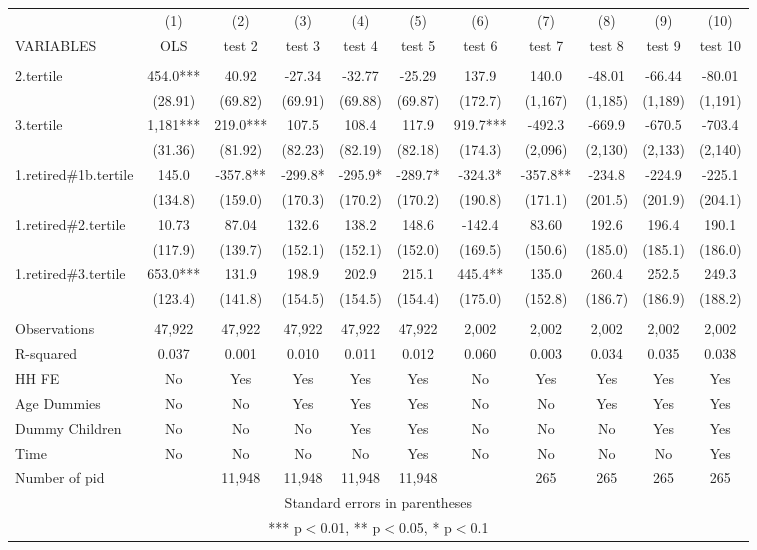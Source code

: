 \begin{tabular}{lcccccccccc} \hline
 & (1) & (2) & (3) & (4) & (5) & (6) & (7) & (8) & (9) & (10) \\
VARIABLES & OLS & test 2 & test 3 & test 4 & test 5 & test 6 & test 7 & test 8 & test 9 & test 10 \\ \hline
 &  &  &  &  &  &  &  &  &  &  \\
2.tertile & 454.0*** & 40.92 & -27.34 & -32.77 & -25.29 & 137.9 & 140.0 & -48.01 & -66.44 & -80.01 \\
 & (28.91) & (69.82) & (69.91) & (69.88) & (69.87) & (172.7) & (1,167) & (1,185) & (1,189) & (1,191) \\
3.tertile & 1,181*** & 219.0*** & 107.5 & 108.4 & 117.9 & 919.7*** & -492.3 & -669.9 & -670.5 & -703.4 \\
 & (31.36) & (81.92) & (82.23) & (82.19) & (82.18) & (174.3) & (2,096) & (2,130) & (2,133) & (2,140) \\
1.retired\#1b.tertile & 145.0 & -357.8** & -299.8* & -295.9* & -289.7* & -324.3* & -357.8** & -234.8 & -224.9 & -225.1 \\
 & (134.8) & (159.0) & (170.3) & (170.2) & (170.2) & (190.8) & (171.1) & (201.5) & (201.9) & (204.1) \\
1.retired\#2.tertile & 10.73 & 87.04 & 132.6 & 138.2 & 148.6 & -142.4 & 83.60 & 192.6 & 196.4 & 190.1 \\
 & (117.9) & (139.7) & (152.1) & (152.1) & (152.0) & (169.5) & (150.6) & (185.0) & (185.1) & (186.0) \\
1.retired\#3.tertile & 653.0*** & 131.9 & 198.9 & 202.9 & 215.1 & 445.4** & 135.0 & 260.4 & 252.5 & 249.3 \\
 & (123.4) & (141.8) & (154.5) & (154.5) & (154.4) & (175.0) & (152.8) & (186.7) & (186.9) & (188.2) \\
 &  &  &  &  &  &  &  &  &  &  \\
Observations & 47,922 & 47,922 & 47,922 & 47,922 & 47,922 & 2,002 & 2,002 & 2,002 & 2,002 & 2,002 \\
R-squared & 0.037 & 0.001 & 0.010 & 0.011 & 0.012 & 0.060 & 0.003 & 0.034 & 0.035 & 0.038 \\
HH FE & No & Yes & Yes & Yes & Yes & No & Yes & Yes & Yes & Yes \\
Age Dummies & No & No & Yes & Yes & Yes & No & No & Yes & Yes & Yes \\
Dummy Children & No & No & No & Yes & Yes & No & No & No & Yes & Yes \\
Time & No & No & No & No & Yes & No & No & No & No & Yes \\
 Number of pid &  & 11,948 & 11,948 & 11,948 & 11,948 &  & 265 & 265 & 265 & 265 \\ \hline
\multicolumn{11}{c}{ Standard errors in parentheses} \\
\multicolumn{11}{c}{ *** p$<$0.01, ** p$<$0.05, * p$<$0.1} \\
\end{tabular}
